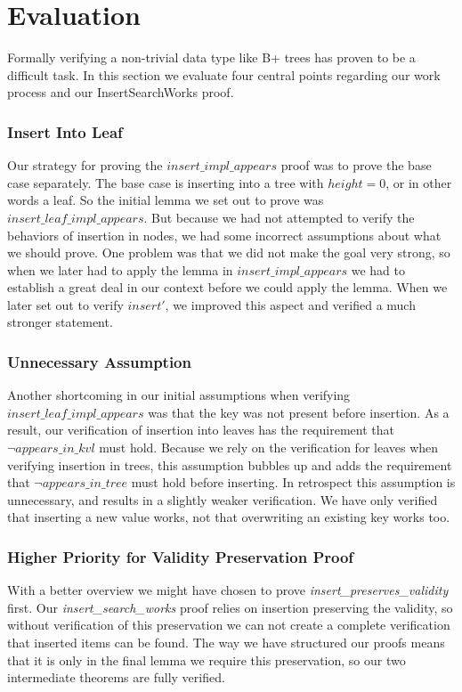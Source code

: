 \section{Evaluation}
\label{sec:Evaluation}
Formally verifying a non-trivial data type like B+ trees has proven to be a difficult task. In this section we evaluate four central points regarding our work process and our InsertSearchWorks proof.

\subsubsection{Insert Into Leaf}
Our strategy for proving the $insert\_impl\_appears$ proof was to prove the base case separately. The base case is inserting into a tree with $height = 0$, or in other words a leaf. So the initial lemma we set out to prove was $insert\_leaf\_impl\_appears$. But because we had not attempted to verify the behaviors of insertion in nodes, we had some incorrect assumptions about what we should prove. One problem was that we did not make the goal very strong, so when we later had to apply the lemma in $insert\_impl\_appears$ we had to establish a great deal in our context before we could apply the lemma. When we later set out to verify $insert'$, we improved this aspect and verified a much stronger statement.

\subsubsection{Unnecessary Assumption}
Another shortcoming in our initial assumptions when verifying $insert\_leaf\_impl\_appears$ was that the key was not present before insertion. As a result, our verification of insertion into leaves has the requirement that $\lnot appears\_in\_kvl$ must hold. Because we rely on the verification for leaves when verifying insertion in trees, this assumption bubbles up and adds the requirement that $\lnot appears\_in\_tree$ must hold before inserting. In retrospect this assumption is unnecessary, and results in a slightly weaker verification. We have only verified that inserting a new value works, not that overwriting an existing key works too. 

\subsubsection{Higher Priority for Validity Preservation Proof}

With a better overview we might have chosen to prove \textit{insert\allowbreak{}\_preserves\allowbreak{}\_validity} first. Our \textit{insert\allowbreak{}\_search\allowbreak{}\_works} proof relies on insertion preserving the validity, so without verification of this preservation we can not create a complete verification that inserted items can be found. The way we have structured our proofs means that it is only in the final lemma we require this preservation, so our two intermediate theorems are fully verified.

